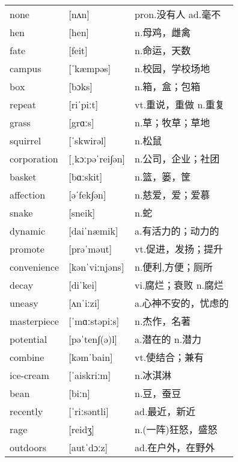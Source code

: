 \documentclass[a4paper]{article}
\begin{document}
\section{}
\begin{tabular}{l l l}

none & [nʌn] & pron.没有人 ad.毫不 \\
hen & [hen] & n.母鸡，雌禽 \\
fate & [feit] & n.命运，天数 \\
campus & [ˈkæmpəs] & n.校园，学校场地 \\
box & [bɔks] & n.箱，盒；包箱 \\
repeat & [riˈpiːt] & vt.重说，重做 n.重复 \\
grass & [grɑːs] & n.草；牧草；草地 \\
squirrel & [ˈskwirəl] & n.松鼠 \\
corporation & [ˌkɔːpəˈrei∫ən] & n.公司，企业；社团 \\
basket & [bɑːskit] & n.篮，篓，筐 \\
affection & [əˈfek∫ən] & n.慈爱，爱；爱慕 \\
snake & [sneik] & n.蛇 \\
dynamic & [daiˈnæmik] & a.有活力的；动力的 \\
promote & [prəˈməut] & vt.促进，发扬；提升 \\
convenience & [kənˈviːnjəns] & n.便利,方便；厕所 \\
decay & [diˈkei] & vi.腐烂；衰败 n.腐烂 \\
uneasy & [ʌnˈiːzi] & a.心神不安的，忧虑的 \\
masterpiece & [ˈmɑːstəpiːs] & n.杰作，名著 \\
potential & [pəˈten∫(ə)l] & a.潜在的 n.潜力 \\
combine & [kəmˈbain] & vt.使结合；兼有 \\
ice-cream & [ˈaiskriːm] & n.冰淇淋 \\
bean & [biːn] & n.豆，蚕豆 \\
recently & [ˈriːsəntli] & ad.最近，新近 \\
rage & [reidʒ] & n.(一阵)狂怒，盛怒 \\
outdoors & [autˈdɔːz] & ad.在户外，在野外 \\

\end{tabular}
\end{document}
